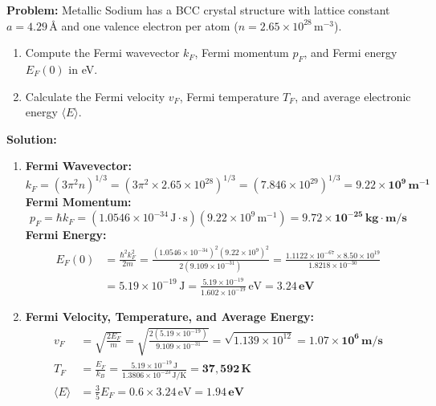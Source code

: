 \begin{examplebox}
\textbf{Problem:} Metallic Sodium has a BCC crystal structure with lattice constant $a = 4.29\,\text{\AA}$ and one valence electron per atom ($n = 2.65 \times 10^{28}\,\text{m}^{-3}$).
\begin{enumerate}[label=(\alph*)]
    \item Compute the Fermi wavevector $k_F$, Fermi momentum $p_F$, and Fermi energy $E_F(0)$ in eV.
    \item Calculate the Fermi velocity $v_F$, Fermi temperature $T_F$, and average electronic energy $\langle E \rangle$.
\end{enumerate}

\textbf{Solution:}
\begin{enumerate}[label=(\alph*)]
    \item \textbf{Fermi Wavevector:}
    \begin{equation}
        k_F = (3\pi^2 n)^{1/3} = \left(3\pi^2 \times 2.65 \times 10^{28}\right)^{1/3} = (7.846 \times 10^{29})^{1/3} = \mathbf{9.22 \times 10^9\,\text{m}^{-1}}
    \end{equation}
    \textbf{Fermi Momentum:}
    \begin{equation}
        p_F = \hbar k_F = (1.0546 \times 10^{-34}\,\text{J}\cdot\text{s})(9.22 \times 10^9\,\text{m}^{-1}) = \mathbf{9.72 \times 10^{-25}\,\text{kg}\cdot\text{m/s}}
    \end{equation}
    \textbf{Fermi Energy:}
    \begin{align}
        E_F(0) &= \frac{\hbar^2 k_F^2}{2m} = \frac{(1.0546 \times 10^{-34})^2 (9.22 \times 10^9)^2}{2(9.109 \times 10^{-31})} = \frac{1.1122 \times 10^{-67} \times 8.50 \times 10^{19}}{1.8218 \times 10^{-30}} \\
        &= 5.19 \times 10^{-19}\,\text{J} = \frac{5.19 \times 10^{-19}}{1.602 \times 10^{-19}}\,\text{eV} = \mathbf{3.24\,\text{eV}}
    \end{align}
    \item \textbf{Fermi Velocity, Temperature, and Average Energy:}
    \begin{align}
        v_F &= \sqrt{\frac{2E_F}{m}} = \sqrt{\frac{2(5.19 \times 10^{-19})}{9.109 \times 10^{-31}}} = \sqrt{1.139 \times 10^{12}} = \mathbf{1.07 \times 10^6\,\text{m/s}} \\
        T_F &= \frac{E_F}{k_B} = \frac{5.19 \times 10^{-19}\,\text{J}}{1.3806 \times 10^{-23}\,\text{J/K}} = \mathbf{37{,}592\,\text{K}} \\
        \langle E \rangle &= \frac{3}{5}E_F = 0.6 \times 3.24\,\text{eV} = \mathbf{1.94\,\text{eV}}
    \end{align}
\end{enumerate}
\end{examplebox}

